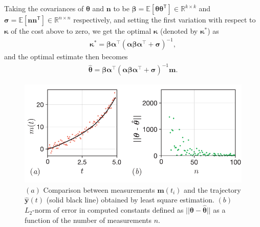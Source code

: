 \documentclass{resonance}
\def\R{\mathbb{R}}
\def\E{\mathbb{E}}
\def\th{\bm{\theta}}
\def\thh{\bm{\hat{\theta}}}
\def\yh{\bm{\hat{y}}}
\def\n{\bm{n}}
\def\m{\bm{m}}
\def\p{\bm{\beta}}
\def\K{\bm{\kappa}}
\def\T{\mathsf{T}}
\def\S{\bm{\sigma}}
\def\H{\bm{\alpha}}
\def\E{\mathbb{E}}
\begin{document}
Taking the covariances of $\th$ and $\n$ to be $\p = \E[\th \th^\T] \in \R^{k\times k}$
and $\S=\E[\n\n^\T] \in \R^{n\times n}$ respectively, and setting the first variation with
respect to $\K$ of the cost above to zero,
we get the optimal $\K$ (denoted by $\K^*$) as
\begin{align*}
    \K^* = \p \H^\top \left( \H \p \H^\top + \S \right)^{-1},
\end{align*}
and the optimal estimate then becomes
\begin{align*}
    \hat{\th} =  \p \H^\top \left( \H \p \H^\top + \S \right)^{-1} \m.
\end{align*}

\begin{figure}
    \centering
    \includegraphics[width=\textwidth]{./figs/lse.pdf}
    \caption{$(a)$ Comparison between measurements $\m(t_i)$ and the trajectory $\yh(t)$ (solid black line) obtained by least square estimation. $(b)$ $L_2$-norm of error in computed constants defined as $||\th - \thh ||$ as a function of the number of measurements $n$.}
    \label{fig:lseFig}
\end{figure}
\end{document}

